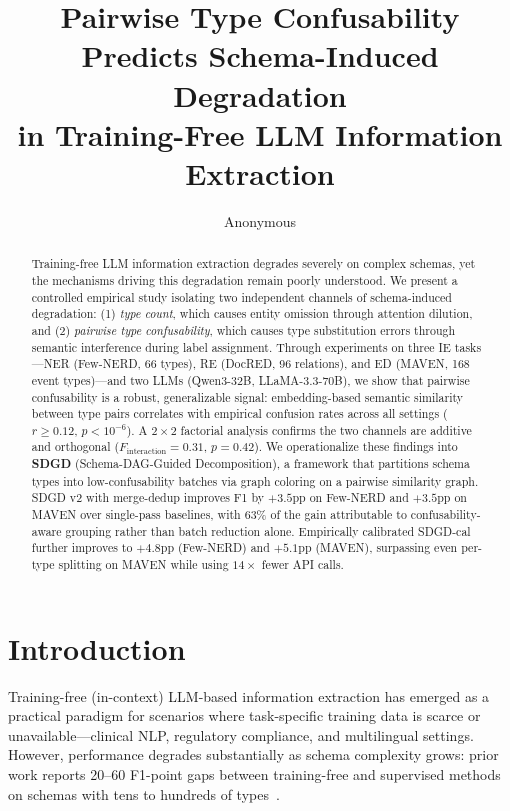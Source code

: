 \documentclass[11pt,a4paper]{article}
\title{Pairwise Type Confusability Predicts Schema-Induced Degradation\\in Training-Free LLM Information Extraction}
\author{Anonymous}
\begin{document}
\maketitle

\begin{abstract}
Training-free LLM information extraction degrades severely on complex schemas, yet the mechanisms driving this degradation remain poorly understood.
We present a controlled empirical study isolating two independent channels of schema-induced degradation: (1) \emph{type count}, which causes entity omission through attention dilution, and (2) \emph{pairwise type confusability}, which causes type substitution errors through semantic interference during label assignment.
Through experiments on three IE tasks---NER (Few-NERD, 66 types), RE (DocRED, 96 relations), and ED (MAVEN, 168 event types)---and two LLMs (Qwen3-32B, LLaMA-3.3-70B), we show that pairwise confusability is a robust, generalizable signal: embedding-based semantic similarity between type pairs correlates with empirical confusion rates across all settings ($r \geq 0.12$, $p < 10^{-6}$).
A $2 \times 2$ factorial analysis confirms the two channels are additive and orthogonal ($F_{\text{interaction}} = 0.31$, $p = 0.42$).
We operationalize these findings into \textbf{SDGD} (Schema-DAG-Guided Decomposition), a framework that partitions schema types into low-confusability batches via graph coloring on a pairwise similarity graph.
SDGD v2 with merge-dedup improves F1 by $+3.5$pp on Few-NERD and $+3.5$pp on MAVEN over single-pass baselines, with 63\% of the gain attributable to confusability-aware grouping rather than batch reduction alone.
Empirically calibrated SDGD-cal further improves to $+4.8$pp (Few-NERD) and $+5.1$pp (MAVEN), surpassing even per-type splitting on MAVEN while using $14\times$ fewer API calls.
\end{abstract}

\section{Introduction}
\label{sec:intro}

Training-free (in-context) LLM-based information extraction has emerged as a practical paradigm for scenarios where task-specific training data is scarce or unavailable---clinical NLP, regulatory compliance, and multilingual settings.
However, performance degrades substantially as schema complexity grows: prior work reports 20--60 F1-point gaps between training-free and supervised methods on schemas with tens to hundreds of types~\cite{wang2023gptner,xie2023empirical}.
\end{document}
